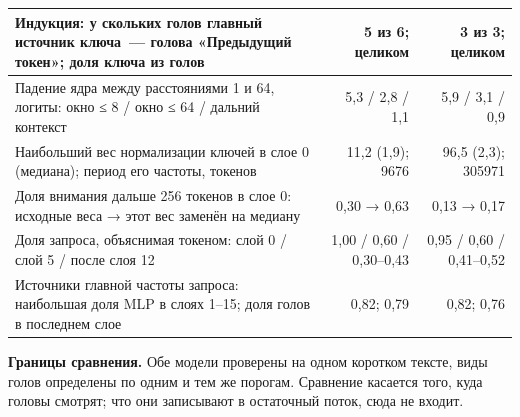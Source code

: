 \documentclass[10pt]{article}
\begin{document}
\begin{minipage}{\linewidth}
\begin{center}
{\begin{tabular}{|p{11.2cm}|r|r|}
Индукция: у скольких голов главный источник ключа~— голова «Предыдущий токен»; доля ключа из голов & 5 из 6; целиком & 3 из 3; целиком \\ \hline
Падение ядра между расстояниями 1 и 64, логиты: окно ≤ 8 / окно ≤ 64 / дальний контекст & 5,3 / 2,8 / 1,1 & 5,9 / 3,1 / 0,9 \\ \hline
Наибольший вес нормализации ключей в слое 0 (медиана); период его частоты, токенов & 11,2 (1,9); 9676 & 96,5 (2,3); 305971 \\ \hline
Доля внимания дальше 256 токенов в слое 0: исходные веса → этот вес заменён на медиану & 0,30 → 0,63 & 0,13 → 0,17 \\ \hline
Доля запроса, объяснимая токеном: слой 0 / слой 5 / после слоя 12 & 1,00 / 0,60 / 0,30–0,43 & 0,95 / 0,60 / 0,41–0,52 \\ \hline
Источники главной частоты запроса: наибольшая доля MLP в слоях 1–15; доля голов в последнем слое & 0,82; 0,79 & 0,82; 0,76 \\ \hline
\hline\end{tabular}}\end{center}
\end{minipage}
\par
\textbf{Границы сравнения.} Обе модели проверены на одном коротком тексте, виды голов определены по одним и тем же порогам. Сравнение касается того, куда головы смотрят; что они записывают в остаточный поток, сюда не входит.
\end{document}
